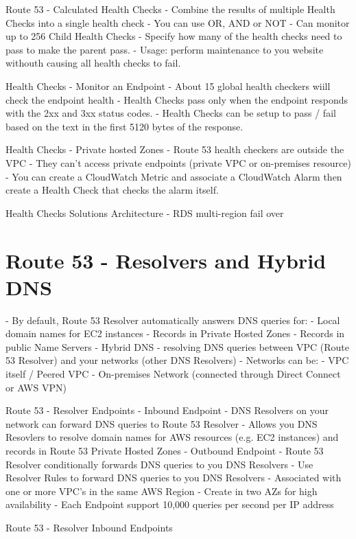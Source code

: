Route 53 - Calculated Health Checks
- Combine the results of multiple Health Checks into a single health check
- You can use OR, AND or NOT
- Can monitor up to 256 Child Health Checks
- Specify how many of the health checks need to pass to make the parent pass.
- Usage: perform maintenance to you website withouth causing all health checks to fail.

Health Checks - Monitor an Endpoint
- About 15 global health checkers wiill check the endpoint health
- Health Checks pass only when the endpoint responds with the 2xx and 3xx status codes.
- Health Checks can be setup to pass / fail based on the text in the first 5120 bytes of the response.

Health Checks - Private hosted Zones
- Route 53 health checkers are outside the VPC
- They can't access private endpoints (private VPC or on-premises resource)
- You can create a CloudWatch Metric and associate a CloudWatch Alarm then create a Health Check that checks the alarm itself.

Health Checks Solutions Architecture - RDS multi-region fail over


\section{Route 53 - Resolvers and Hybrid DNS}
- By default, Route 53 Resolver automatically answers DNS queries for:
- Local domain names for EC2 instances
- Records in Private Hosted Zones
- Records in public Name Servers
- Hybrid DNS - resolving DNS queries between VPC (Route 53 Resolver) and your networks (other DNS Resolvers)
- Networks can be:
- VPC itself / Peered VPC
- On-premises Network (connected through Direct Connect or AWS VPN)

Route 53 - Resolver Endpoints
- Inbound Endpoint
- DNS Resolvers on your network can forward DNS queries to Route 53 Resolver
- Allows you DNS Resovlers to resolve domain names for AWS resources (e.g. EC2 instances) and records in Route 53 Private Hosted Zones
- Outbound Endpoint
- Route 53 Resolver conditionally forwards DNS queries to you DNS Resolvers
- Use Resolver Rules to forward DNS queries to you DNS Resolvers
- Associated with one or more VPC's in the same AWS Region
- Create in two AZs for high availability
- Each Endpoint support 10,000 queries per second per IP address

Route 53 - Resolver Inbound Endpoints

